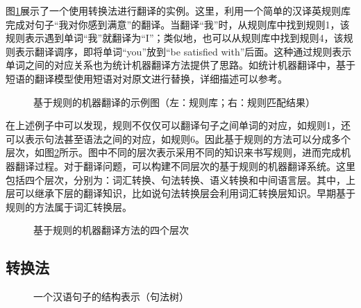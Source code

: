 \parinterval 图\ref{fig:1-9}展示了一个使用转换法进行翻译的实例。这里，利用一个简单的汉译英规则库完成对句子“我对你感到满意”的翻译。当翻译“我”时，从规则库中找到规则1，该规则表示遇到单词“我”就翻译为“I”；类似地，也可以从规则库中找到规则4，该规则表示翻译调序，即将单词“you”放到“be satisfied with”后面。这种通过规则表示单词之间的对应关系也为统计机器翻译方法提供了思路。如统计机器翻译中，基于短语的翻译模型使用短语对对原文进行替换，详细描述可以参考{\chapterseven}。

\begin{figure}[htp]
    \centering

    \caption{基于规则的机器翻译的示例图（左：规则库；右：规则匹配结果）}
    \label{fig:1-9}
\end{figure}

\parinterval 在上述例子中可以发现，规则不仅仅可以翻译句子之间单词的对应，如规则1，还可以表示句法甚至语法之间的对应，如规则6。因此基于规则的方法可以分成多个层次，如图\ref{fig:1-10}所示。图中不同的层次表示采用不同的知识来书写规则，进而完成机器翻译过程。对于翻译问题，可以构建不同层次的基于规则的机器翻译系统。这里包括四个层次，分别为：词汇转换、句法转换、语义转换和中间语言层。其中，上层可以继承下层的翻译知识，比如说句法转换层会利用词汇转换层知识。早期基于规则的方法属于词汇转换层。

\begin{figure}[htp]
    \centering

    \caption{基于规则的机器翻译方法的四个层次}
\setlength{\belowcaptionskip}{-1.5em}
    \label{fig:1-10}
\end{figure}


\subsection{转换法}
\begin{figure}[htp]
    \centering

    \caption{一个汉语句子的结构表示（句法树）}
    \label{fig:1-12}
\end{figure}


